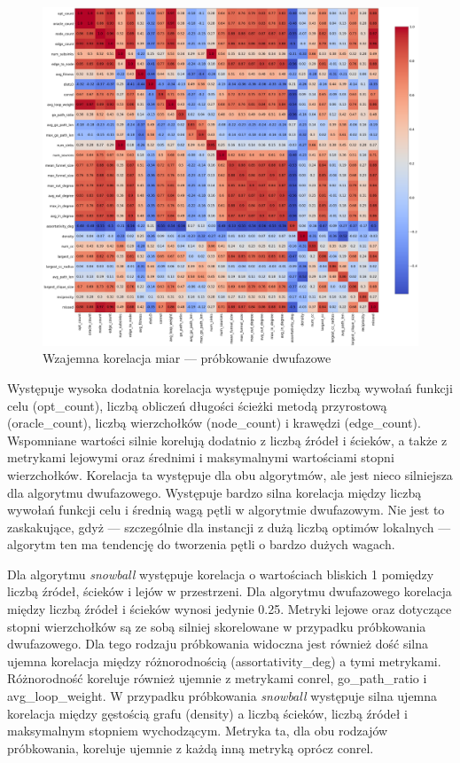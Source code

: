 \begin{figure}[h!]
    \centering
    \includegraphics[width=\textwidth]{chapters/experiments/img/twophase_corr.png}
    \caption{Wzajemna korelacja miar --- próbkowanie dwufazowe}
    \label{fig:corr_twophase}
\end{figure}

Występuje wysoka dodatnia korelacja występuje pomiędzy liczbą wywołań funkcji celu (opt\_count),
liczbą obliczeń długości ścieżki metodą przyrostową (oracle\_count), liczbą wierzchołków (node\_count) i krawędzi (edge\_count).
Wspomniane wartości silnie korelują dodatnio z liczbą źródeł i ścieków, a także z metrykami lejowymi oraz średnimi i maksymalnymi wartościami stopni wierzchołków.
Korelacja ta występuje dla obu algorytmów, ale jest nieco silniejsza dla algorytmu dwufazowego.
Występuje bardzo silna korelacja między liczbą wywołań funkcji celu i średnią wagą pętli w algorytmie dwufazowym.
Nie jest to zaskakujące, gdyż --- szczególnie dla instancji z dużą liczbą optimów lokalnych --- algorytm ten ma tendencję do tworzenia pętli o bardzo dużych wagach.

Dla algorytmu \textit{snowball} występuje korelacja o wartościach bliskich 1 pomiędzy liczbą źródeł, ścieków i lejów w przestrzeni.
Dla algorytmu dwufazowego korelacja między liczbą źródeł i ścieków wynosi jedynie 0.25.
Metryki lejowe oraz dotyczące stopni wierzchołków są ze sobą silniej skorelowane w przypadku próbkowania dwufazowego.
Dla tego rodzaju próbkowania widoczna jest również dość silna ujemna korelacja między różnorodnością (assortativity\_deg) a tymi metrykami.
Różnorodność koreluje również ujemnie z metrykami conrel, go\_path\_ratio i avg\_loop\_weight.
W przypadku próbkowania \textit{snowball} występuje silna ujemna korelacja między gęstością grafu (density) a liczbą ścieków, liczbą źródeł i maksymalnym stopniem wychodzącym.
Metryka ta, dla obu rodzajów próbkowania, koreluje ujemnie z każdą inną metryką oprócz conrel.

